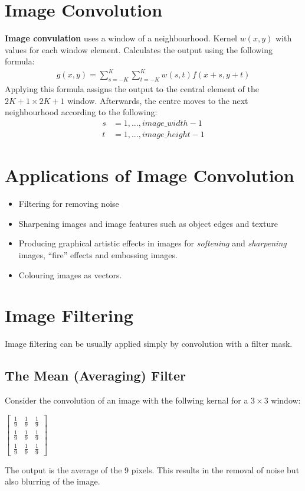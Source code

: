 \documentclass{article}
\newcommand{\ninth}{\frac{1}{9}}
\begin{document}
\section{Image Convolution}
\textbf{Image convulation} uses a window of a neighbourhood.
Kernel $w(x,y)$ with values for each window element.
Calculates the output using the following formula:
\begin{align*}
	g(x,y) = \sum^K_{s=-K}\sum^K_{t=-K}w(s,t)f(x+s,y+t)
\end{align*}
Applying this formula assigns the output to the central element of the $2K+1 \times 2K+1$ window.
Afterwards, the centre moves to the next neighbourhood according to the following:
\begin{align*}
	s &= 1,..., image\_width-1 \\
	t &= 1,..., image\_height-1
\end{align*}

\section{Applications of Image Convolution}
\begin{itemize}
	\item Filtering for removing noise
	\item Sharpening images and image features such as object edges and texture
	\item Producing graphical artistic effects in images for \textit{softening} and \textit{sharpening} images, ``fire'' effects and embossing images.
	\item Colouring images as vectors.
\end{itemize}

\section{Image Filtering}
Image filtering can be usually applied simply by convolution with a filter mask.

\subsection{The Mean (Averaging) Filter}
Consider the convolution of an image with the follwing kernal for a $3 \times 3$ window:
\smallskip
\centerline{$
\begin{bmatrix}
	\ninth & \ninth & \ninth \\
	\ninth & \ninth & \ninth \\
	\ninth & \ninth & \ninth
\end{bmatrix}
$}
The output is the average of the 9 pixels.
This results in the removal of noise but also blurring of the image.
\end{document}

